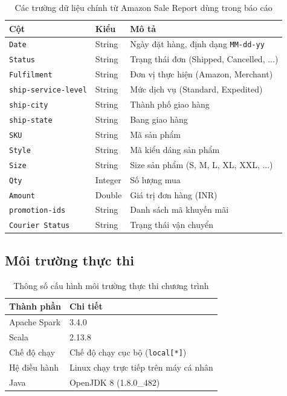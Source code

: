 \begin{table}[H]
\centering
\begin{tabular}{lll}
\toprule
\textbf{Cột} & \textbf{Kiểu} & \textbf{Mô tả} \\
\midrule
\texttt{Date}              & String  & Ngày đặt hàng, định dạng \texttt{MM-dd-yy} \\
\texttt{Status}            & String  & Trạng thái đơn (Shipped, Cancelled, ...) \\
\texttt{Fulfilment}        & String  & Đơn vị thực hiện (Amazon, Merchant) \\
\texttt{ship-service-level}& String  & Mức dịch vụ (Standard, Expedited) \\
\texttt{ship-city}         & String  & Thành phố giao hàng \\
\texttt{ship-state}        & String  & Bang giao hàng \\
\texttt{SKU}               & String  & Mã sản phẩm \\
\texttt{Style}             & String  & Mã kiểu dáng sản phẩm \\
\texttt{Size}              & String  & Size sản phẩm (S, M, L, XL, XXL, ...) \\
\texttt{Qty}               & Integer & Số lượng mua \\
\texttt{Amount}            & Double  & Giá trị đơn hàng (INR) \\
\texttt{promotion-ids}     & String  & Danh sách mã khuyến mãi \\
\texttt{Courier Status}    & String  & Trạng thái vận chuyển \\
\bottomrule
\end{tabular}
\caption{Các trường dữ liệu chính từ Amazon Sale Report dùng trong báo cáo}
\label{tab:amazon_dataset_columns}
\end{table}

\subsection{Môi trường thực thi}

\begin{table}[H]
\centering
\begin{tabular}{ll}
\toprule
\textbf{Thành phần} & \textbf{Chi tiết} \\
\midrule
Apache Spark  & 3.4.0 \\
Scala         & 2.13.8 \\
Chế độ chạy   & Chế độ chạy cục bộ (\texttt{local[*]}) \\
Hệ điều hành  & Linux chạy trực tiếp trên máy cá nhân \\
Java          & OpenJDK 8 (1.8.0\_482) \\
\bottomrule
\end{tabular}
\caption{Thông số cấu hình môi trường thực thi chương trình}
\label{tab:execution_environment}
\end{table}

